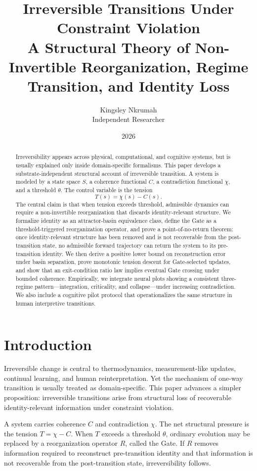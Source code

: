 \documentclass[12pt]{article}
\title{Irreversible Transitions Under Constraint Violation\\
\large A Structural Theory of Non-Invertible Reorganization, Regime Transition, and Identity Loss}
\author{Kingsley Nkrumah\\Independent Researcher}
\date{2026}
\begin{document}
\maketitle

\begin{abstract}
Irreversibility appears across physical, computational, and cognitive systems, but is usually explained only inside domain-specific formalisms. This paper develops a substrate-independent structural account of irreversible transition. A system is modeled by a state space $S$, a coherence functional $C$, a contradiction functional $\chi$, and a threshold $\theta$. The control variable is the tension
\[
T(s) = \chi(s) - C(s).
\]
The central claim is that when tension exceeds threshold, admissible dynamics can require a non-invertible reorganization that discards identity-relevant structure. We formalize identity as an attractor-basin equivalence class, define the Gate as a threshold-triggered reorganization operator, and prove a point-of-no-return theorem: once identity-relevant structure has been removed and is not recoverable from the post-transition state, no admissible forward trajectory can return the system to its pre-transition identity. We then derive a positive lower bound on reconstruction error under basin separation, prove monotonic tension descent for Gate-selected updates, and show that an exit-condition ratio law implies eventual Gate crossing under bounded coherence. Empirically, we integrate neural plots showing a consistent three-regime pattern---integration, criticality, and collapse---under increasing contradiction. We also include a cognitive pilot protocol that operationalizes the same structure in human interpretive transitions.
\end{abstract}

\section{Introduction}

Irreversible change is central to thermodynamics, measurement-like updates, continual learning, and human reinterpretation. Yet the mechanism of one-way transition is usually treated as domain-specific. This paper advances a simpler proposition: irreversible transitions arise from structural loss of recoverable identity-relevant information under constraint violation.

A system carries coherence $C$ and contradiction $\chi$. The net structural pressure is the tension $T = \chi - C$. When $T$ exceeds a threshold $\theta$, ordinary evolution may be replaced by a reorganization operator $R$, called the Gate. If $R$ removes information required to reconstruct pre-transition identity and that information is not recoverable from the post-transition state, irreversibility follows.
\end{document}
